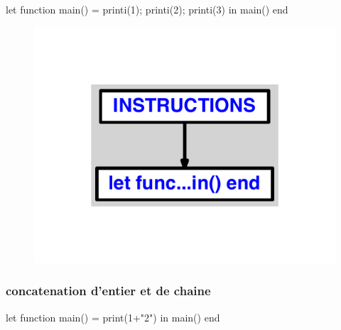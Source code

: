 \documentclass{article}
\begin{document}
\begin{verbatimtab}
let function main() = printi(1); printi(2); printi(3) in main() end
\end{verbatimtab}
\begin{figure}[H]\centering\includegraphics[max width=\textwidth]{ast/ast_140.pdf}\end{figure}\subsubsection{concatenation d'entier et de chaine}
\begin{verbatimtab}
let
	function main() = print(1+"2")
in main() end
\end{verbatimtab}
\end{document}
